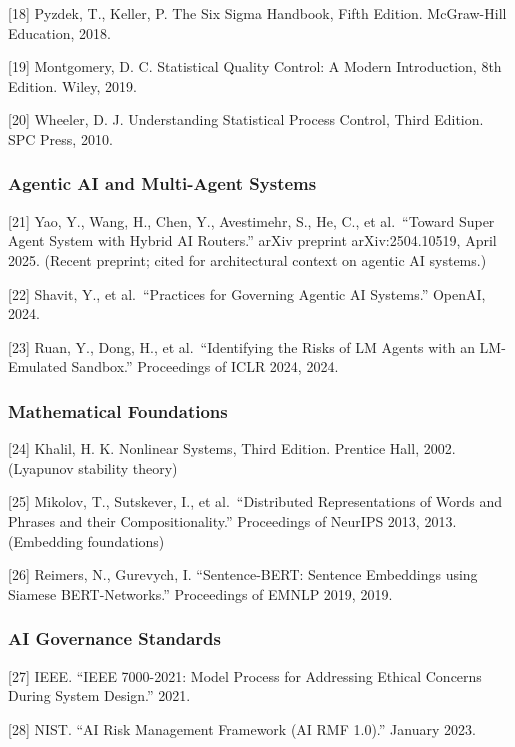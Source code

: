 {[}18{]} Pyzdek, T., Keller, P. The Six Sigma Handbook, Fifth Edition.
McGraw-Hill Education, 2018.

{[}19{]} Montgomery, D. C. Statistical Quality Control: A Modern
Introduction, 8th Edition. Wiley, 2019.

{[}20{]} Wheeler, D. J. Understanding Statistical Process Control, Third
Edition. SPC Press, 2010.

\subsubsection{Agentic AI and Multi-Agent
Systems}\label{agentic-ai-and-multi-agent-systems-1}

{[}21{]} Yao, Y., Wang, H., Chen, Y., Avestimehr, S., He, C., et
al.~``Toward Super Agent System with Hybrid AI Routers.'' arXiv preprint
arXiv:2504.10519, April 2025. (Recent preprint; cited for architectural
context on agentic AI systems.)

{[}22{]} Shavit, Y., et al.~``Practices for Governing Agentic AI
Systems.'' OpenAI, 2024.

{[}23{]} Ruan, Y., Dong, H., et al.~``Identifying the Risks of LM Agents
with an LM-Emulated Sandbox.'' Proceedings of ICLR 2024, 2024.

\subsubsection{Mathematical Foundations}\label{mathematical-foundations}

{[}24{]} Khalil, H. K. Nonlinear Systems, Third Edition. Prentice Hall,
2002. (Lyapunov stability theory)

{[}25{]} Mikolov, T., Sutskever, I., et al.~``Distributed
Representations of Words and Phrases and their Compositionality.''
Proceedings of NeurIPS 2013, 2013. (Embedding foundations)

{[}26{]} Reimers, N., Gurevych, I. ``Sentence-BERT: Sentence Embeddings
using Siamese BERT-Networks.'' Proceedings of EMNLP 2019, 2019.

\subsubsection{AI Governance Standards}\label{ai-governance-standards}

{[}27{]} IEEE. ``IEEE 7000-2021: Model Process for Addressing Ethical
Concerns During System Design.'' 2021.

{[}28{]} NIST. ``AI Risk Management Framework (AI RMF 1.0).'' January
2023.

